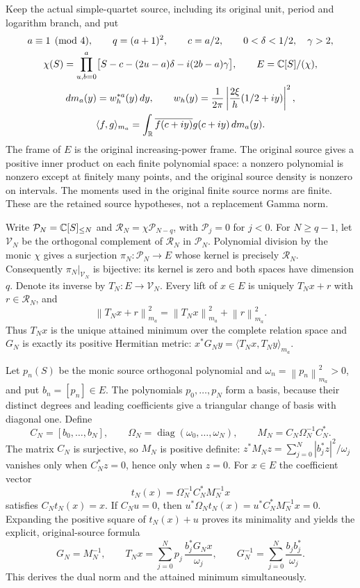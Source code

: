 \documentclass[11pt,a4paper]{article}
\providecommand{\diag}{\operatorname{diag}}
\providecommand{\norm}[1]{\left\lVert#1\right\rVert}
\begin{document}
Keep the actual simple-quartet source, including its original unit,
period and logarithm branch, and put
\begin{equation}\label{a04oid:oid:objects}
\begin{gathered}
a\equiv1\pmod4,\qquad q=(a+1)^2,\qquad c=a/2,\qquad
0<\delta<1/2,\quad\gamma>2,\\
\chi(S)=\prod_{u,b=0}^a
\bigl[S-c-(2u-a)\delta-i(2b-a)\gamma\bigr],\qquad
E=\mathbb C[S]/(\chi),\\
dm_a(y)=w_h^{*a}(y)\,dy,\qquad
w_h(y)=\frac1{2\pi}\left|\frac{2\xi}{h}(1/2+iy)\right|^2,\\
\langle f,g\rangle_{m_a}
=\int_{\mathbb R}\overline{f(c+iy)}g(c+iy)\,dm_a(y).
\end{gathered}
\end{equation}
The frame of $E$ is the original increasing-power frame. The original
source gives a positive inner product on each finite polynomial space:
a nonzero polynomial is nonzero except at finitely many points, and
the original source density is nonzero on intervals. The moments used
in the original finite source norms are finite. These are the retained
source hypotheses, not a replacement Gamma norm.

Write $\mathcal P_N=\mathbb C[S]_{\leq N}$ and
$\mathcal R_N=\chi\mathcal P_{N-q}$, with $\mathcal P_j=0$ for
$j<0$. For $N\geq q-1$, let $\mathcal V_N$ be the orthogonal
complement of $\mathcal R_N$ in $\mathcal P_N$. Polynomial division
by the monic $\chi$ gives a surjection
$\pi_N:\mathcal P_N\to E$ whose kernel is precisely $\mathcal R_N$.
Consequently $\pi_N|_{\mathcal V_N}$ is bijective: its kernel is
zero and both spaces have dimension $q$. Denote its inverse by
$T_N:E\to\mathcal V_N$. Every lift of $x\in E$ is uniquely
$T_Nx+r$ with $r\in\mathcal R_N$, and
\[
 \norm{T_Nx+r}_{m_a}^2=\norm{T_Nx}_{m_a}^2+\norm r_{m_a}^2.
\]
Thus $T_Nx$ is the unique attained minimum over the complete relation
space and $G_N$ is exactly its positive Hermitian metric:
$x^*G_Ny=\langle T_Nx,T_Ny\rangle_{m_a}$.

Let $p_n(S)$ be the monic source orthogonal polynomial and
$\omega_n=\norm{p_n}_{m_a}^2>0$, and put $b_n=[p_n]\in E$.
The polynomials $p_0,\ldots,p_N$ form a basis, because their distinct
degrees and leading coefficients give a triangular change of basis
with diagonal one. Define
\[
 C_N=[b_0,\ldots,b_N],\qquad
 \Omega_N=\diag(\omega_0,\ldots,\omega_N),\qquad
 M_N=C_N\Omega_N^{-1}C_N^*.
\]
The matrix $C_N$ is surjective, so $M_N$ is positive definite:
$z^*M_Nz=\sum_{j=0}^N|b_j^*z|^2/\omega_j$ vanishes only when
$C_N^*z=0$, hence only when $z=0$. For $x\in E$ the coefficient
vector
\[
 t_N(x)=\Omega_N^{-1}C_N^*M_N^{-1}x
\]
satisfies $C_Nt_N(x)=x$. If $C_Nu=0$, then
$u^*\Omega_Nt_N(x)=u^*C_N^*M_N^{-1}x=0$.
Expanding the positive square of $t_N(x)+u$ proves its minimality
and yields the explicit, original-source formula
\begin{equation}\label{a04oid:oid:minimum}
 G_N=M_N^{-1},\qquad
 T_Nx=\sum_{j=0}^N p_j\,
 \frac{b_j^*G_Nx}{\omega_j},\qquad
 G_N^{-1}=\sum_{j=0}^N\frac{b_jb_j^*}{\omega_j}.
\end{equation}
This derives the dual norm and the attained minimum simultaneously.
\end{document}
